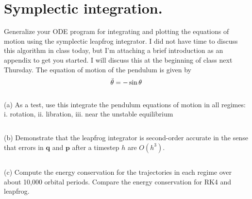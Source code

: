 \section{Symplectic integration.}

Generalize your ODE program for integrating and plotting the equations of motion using the symplectic leapfrog integrator. I did not have
time to discuss this algorithm in class today, but I’m attaching a brief
introduction as an appendix to get you started. I will discuss this at the
beginning of class next Thursday.
The equation of motion of the pendulum is given by
\begin{equation}
    \Ddot{\theta}=-\sin\theta
\end{equation}

\subsection{}
(a) As a test, use this integrate the pendulum equations of motion in
all regimes:
i. rotation,
ii. libration,
iii. near the unstable equilibrium




\subsection{}
(b) Demonstrate that the leapfrog integrator is second-order accurate
in the sense that errors in $\mathbf{q}$ and $\mathbf{p}$ after a timestep $h$ are $O(h^3)$.



\subsection{}
(c) Compute the energy conservation for the trajectories in each regime
over about 10,000 orbital periods. Compare the energy conservation for RK4 and leapfrog.